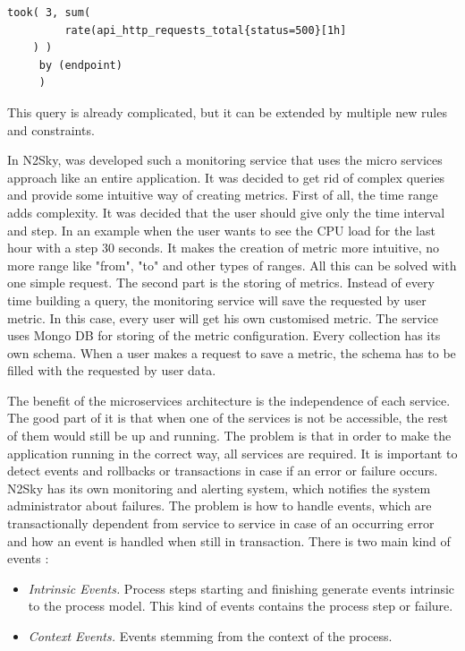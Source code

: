 \begin{lstlisting}[caption=Prometheus alerting rule]
    took( 3, sum(
         rate(api_http_requests_total{status=500}[1h]
    ) )
     by (endpoint)
     )
\end{lstlisting}

This query is already complicated, but it can be extended by multiple new rules and constraints. 

In N2Sky, was developed such a monitoring service that uses the micro services approach like an entire application. It was decided to get rid of complex queries and provide some intuitive way of creating metrics. 
First of all, the time range adds complexity. It was decided that the user should give only the time interval and step. In an example when the user wants to see the CPU load for the last hour with a step 30 seconds. It makes the creation of metric more intuitive, no more range like "from", "to" and other types of ranges. All this can be solved with one simple request. 
The second part is the storing of metrics. Instead of every time building a query, the monitoring service will save the requested by user metric. In this case, every user will get his own customised metric. 
The service uses Mongo DB for storing of the metric configuration. Every collection has its own schema. When a user makes a request to save a metric, the schema has to be filled with the requested by user data.


The benefit of the microservices architecture is the independence of each service. The good part of it is that when one of the services is not be accessible, the rest of them would still be up and running. The problem is that in order to make the application running in the correct way, all services are required. It is important to detect events and rollbacks or transactions in case if an error or failure occurs. N2Sky has its own monitoring and alerting system, which notifies the system administrator about failures. The problem is how to handle events, which are transactionally dependent from service to service in case of an occurring error and how an event is handled when still in transaction. There is two main kind of events \cite{cs5366}: 

\begin{itemize}
\item \emph{Intrinsic Events.} Process steps starting and finishing generate events intrinsic to the process model. This kind of events contains the process step or failure. 
\item \emph{Context Events.} Events stemming from the context of the process.
\end{itemize}

